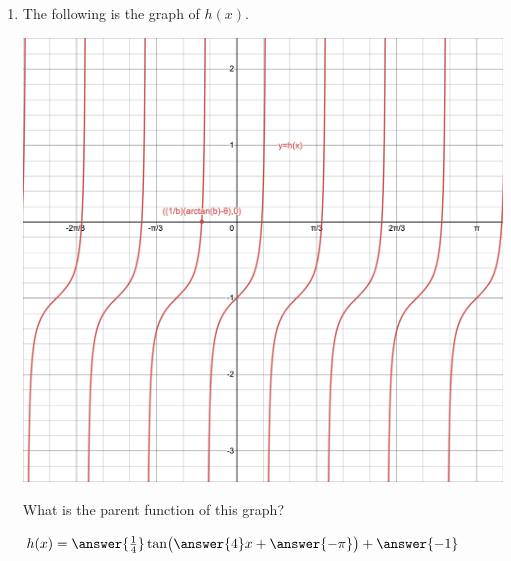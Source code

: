 \documentclass{ximera}
\begin{document}
\begin{exercise}
\begin{enumerate}
\item The following is the graph of $h(x)$.
\begin{image}
\includegraphics[width=1\linewidth]{tanGraphwithHintpoint.png}
\end{image}
What is the parent function of this graph?\\
\begin{exercise}
	$h(x) = \answer{\frac{1}{4}}\tan\!\big(\answer{4}x + \answer{-\pi}\big)+\answer{-1}$
\end{exercise}
	
\end{enumerate}
\end{exercise}
\end{document}
